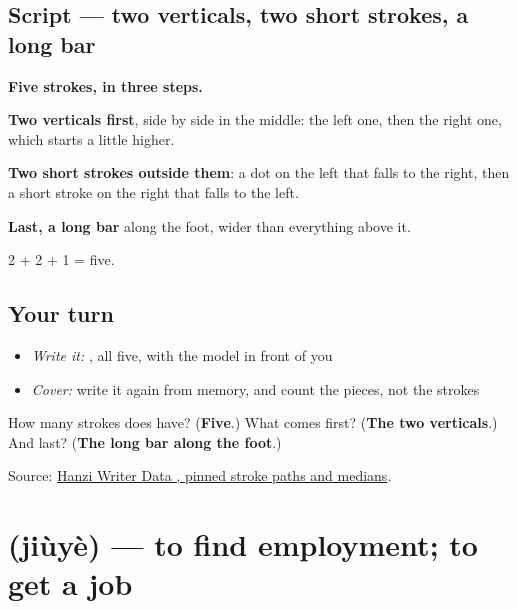 \subsection*{Script — two verticals, two short strokes, a long bar}

\begin{quote}
\end{quote}

\textbf{Five strokes, in three steps.}

\textbf{Two verticals first}, side by side in the middle: the left one, then the right one, which starts a little higher.

\textbf{Two short strokes outside them}: a dot on the left that falls to the right, then a short stroke on the right that falls to the left.

\textbf{Last, a long bar} along the foot, wider than everything above it.

2 + 2 + 1 = five.

\subsection*{Your turn}
\begin{itemize}
\raggedright
  \item \emph{Write it:} , all five, with the model in front of you
  \item \emph{Cover:} write it again from memory, and count the pieces, not the strokes
\end{itemize}

\begin{tcolorbox}[breakable,colback=teal!4,colframe=teal!35!black,title={Before you move on}]
How many strokes does  have? (\textbf{Five}.) What comes first? (\textbf{The two verticals}.) And last? (\textbf{The long bar along the foot}.)

Source: \href{https://raw.githubusercontent.com/chanind/hanzi-writer-data/68d10a4b21150cae5e1ebbd223eed289cf32d90c/data/\%E4\%B8\%9A.json}{Hanzi Writer Data , pinned stroke paths and medians}.
\end{tcolorbox}
\section[\texorpdfstring{\zh{就业} (jiùyè)}{就业 (jiùyè)}]{ (jiùyè) — to find employment; to get a job}

